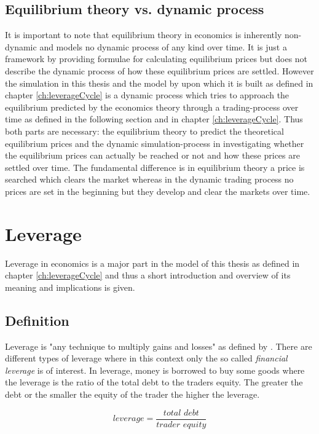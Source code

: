 \documentclass[../Bachelorarbeit.tex]{subfiles}
\begin{document}
\subsection{Equilibrium theory vs. dynamic process}
It is important to note that equilibrium theory in economics is inherently non-dynamic and models no dynamic process of any kind over time. It is just a framework by providing formulae for calculating equilibrium prices but does not describe the dynamic process of how these equilibrium prices are settled. However the simulation in this thesis and the model by \cite{Breuer2015} upon which it is built as defined in chapter \ref{ch:leverageCycle} is a dynamic process which tries to approach the equilibrium predicted by the economics theory through a trading-process over time as defined in the following section and in chapter \ref{ch:leverageCycle}.  Thus both parts are necessary: the equilibrium theory to predict the theoretical equilibrium prices and the dynamic simulation-process in investigating whether the equilibrium prices can actually be reached or not and how these prices are settled over time. The fundamental difference is in equilibrium theory a price is searched which clears the market whereas in the dynamic trading process no prices are set in the beginning but they develop and clear the markets over time.



\section{Leverage}
Leverage in economics is a major part in the model of this thesis as defined in chapter \ref{ch:leverageCycle} and thus a short introduction and overview of its meaning and implications is given.

\subsection{Definition}

Leverage is "any technique to multiply gains and losses" as defined by \cite{Brigham2012}. There are different types of leverage where in this context only the so called \textit{financial leverage} is of interest. In leverage, money is borrowed to buy some goods where the leverage is the ratio of the total debt to the traders equity. The greater the debt or the smaller the equity of the trader the higher the leverage.

\begin{equation}
leverage = \frac{\textit{total debt}}{\textit{trader equity}}
\end{equation}
\end{document}
